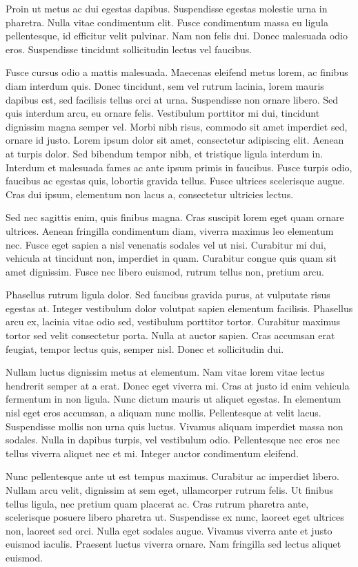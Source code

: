 Proin ut metus ac dui egestas dapibus. Suspendisse egestas molestie urna in pharetra. Nulla vitae condimentum elit. Fusce condimentum massa eu ligula pellentesque, id efficitur velit pulvinar. Nam non felis dui. Donec malesuada odio eros. Suspendisse tincidunt sollicitudin lectus vel faucibus.

Fusce cursus odio a mattis malesuada. Maecenas eleifend metus lorem, ac finibus diam interdum quis. Donec tincidunt, sem vel rutrum lacinia, lorem mauris dapibus est, sed facilisis tellus orci at urna. Suspendisse non ornare libero. Sed quis interdum arcu, eu ornare felis. Vestibulum porttitor mi dui, tincidunt dignissim magna semper vel. Morbi nibh risus, commodo sit amet imperdiet sed, ornare id justo. Lorem ipsum dolor sit amet, consectetur adipiscing elit. Aenean at turpis dolor. Sed bibendum tempor nibh, et tristique ligula interdum in. Interdum et malesuada fames ac ante ipsum primis in faucibus. Fusce turpis odio, faucibus ac egestas quis, lobortis gravida tellus. Fusce ultrices scelerisque augue. Cras dui ipsum, elementum non lacus a, consectetur ultricies lectus.

Sed nec sagittis enim, quis finibus magna. Cras suscipit lorem eget quam ornare ultrices. Aenean fringilla condimentum diam, viverra maximus leo elementum nec. Fusce eget sapien a nisl venenatis sodales vel ut nisi. Curabitur mi dui, vehicula at tincidunt non, imperdiet in quam. Curabitur congue quis quam sit amet dignissim. Fusce nec libero euismod, rutrum tellus non, pretium arcu.

Phasellus rutrum ligula dolor. Sed faucibus gravida purus, at vulputate risus egestas at. Integer vestibulum dolor volutpat sapien elementum facilisis. Phasellus arcu ex, lacinia vitae odio sed, vestibulum porttitor tortor. Curabitur maximus tortor sed velit consectetur porta. Nulla at auctor sapien. Cras accumsan erat feugiat, tempor lectus quis, semper nisl. Donec et sollicitudin dui.

Nullam luctus dignissim metus at elementum. Nam vitae lorem vitae lectus hendrerit semper at a erat. Donec eget viverra mi. Cras at justo id enim vehicula fermentum in non ligula. Nunc dictum mauris ut aliquet egestas. In elementum nisl eget eros accumsan, a aliquam nunc mollis. Pellentesque at velit lacus. Suspendisse mollis non urna quis luctus. Vivamus aliquam imperdiet massa non sodales. Nulla in dapibus turpis, vel vestibulum odio. Pellentesque nec eros nec tellus viverra aliquet nec et mi. Integer auctor condimentum eleifend.

Nunc pellentesque ante ut est tempus maximus. Curabitur ac imperdiet libero. Nullam arcu velit, dignissim at sem eget, ullamcorper rutrum felis. Ut finibus tellus ligula, nec pretium quam placerat ac. Cras rutrum pharetra ante, scelerisque posuere libero pharetra ut. Suspendisse ex nunc, laoreet eget ultrices non, laoreet sed orci. Nulla eget sodales augue. Vivamus viverra ante et justo euismod iaculis. Praesent luctus viverra ornare. Nam fringilla sed lectus aliquet euismod.


